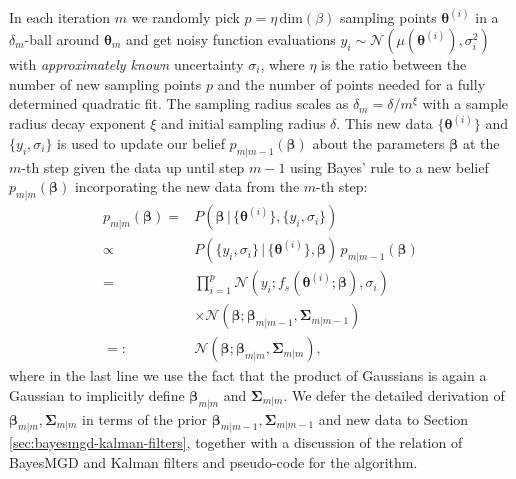 \documentclass[aps,prb,twoside,superscriptaddress,longbibliography,nofootinbib,floatfix, notitlepage,twocolumn]{revtex4-1}
\renewcommand{\vec}[1]{\boldsymbol{#1}}
\begin{document}
In each iteration $m$ we randomly pick $p = \eta\, \mathrm{dim}(\beta)$ sampling points
$\vec\theta^{(i)}$ in a $\delta_m$-ball around $\vec\theta_m$ and get noisy function
evaluations $y_i \sim \mathcal{N}(\mu(\vec\theta^{(i)}), \sigma_i^2)$ with
\emph{approximately known} uncertainty $\sigma_i$, where
$\eta$ is the ratio between the number of new sampling points $p$ and the
number of points needed for a fully determined quadratic fit.
The sampling radius scales as $\delta_m = \delta / m^\xi$ with a sample radius
decay exponent $\xi$ and initial sampling radius $\delta$. This
new data $\{\vec\theta^{(i)}\}$ and $\{y_i, \sigma_i\}$ is used to update our
belief $p_{m|m-1}(\vec\beta)$ about the parameters $\vec\beta$ at the $m$-th step given
the data up until step $m-1$  using Bayes' rule to a new belief $p_{m|m}(\vec\beta)$ incorporating the new data from the $m$-th step: 
\begin{equation}
\begin{aligned}
  p_{m|m}(\vec\beta) =& P(\vec\beta \,|\, \{\vec\theta^{(i)}\}, \{y_i, \sigma_i\}) \\
                 \propto& P(\{y_i, \sigma_i\}\,|\, \{\vec\theta^{(i)}\}, \vec\beta)
                  \, p_{m|m-1}(\vec\beta) \\ 
                 =& \prod_{i=1}^p \mathcal{N}(y_i; f_s(\vec\theta^{(i)}; \vec\beta), \sigma_i)  
                    \\ & \times 
                        \mathcal{N}(\vec\beta ; \vec\beta_{m|m-1}, \vec\Sigma_{m|m-1}) \\
                 =:& \mathcal{N}(\vec\beta ; \vec\beta_{m|m}, \vec\Sigma_{m|m}),
\end{aligned}
\label{eq:bayesmgd-update}
\end{equation}
where in the last line we use the fact that the product of Gaussians is again
a Gaussian to implicitly define $\vec\beta_{m|m}$ and $\vec\Sigma_{m|m}$. We defer the detailed 
derivation of $\vec\beta_{m|m}, \vec\Sigma_{m|m}$ in terms of the prior
$\vec\beta_{m|m-1}, \vec\Sigma_{m|m-1}$ and new data to Section
\ref{sec:bayesmgd-kalman-filters}, together with a discussion of the relation of 
BayesMGD and Kalman filters and pseudo-code for the algorithm.
\end{document}
